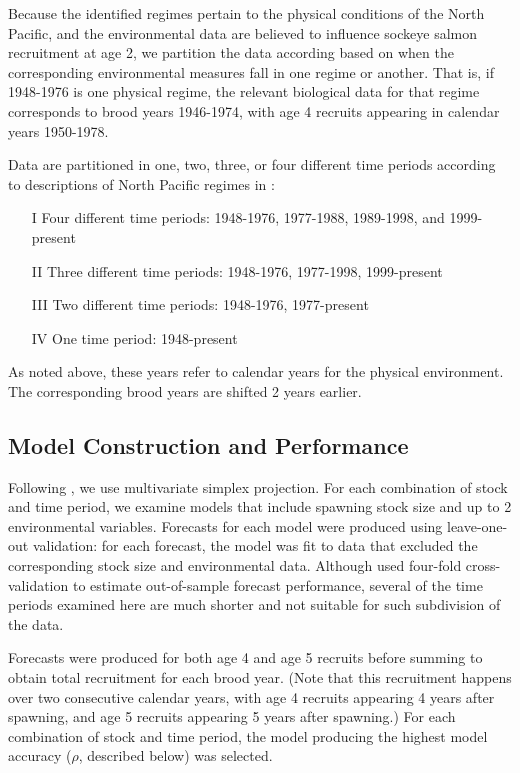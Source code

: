 Because the identified regimes pertain to the physical conditions of the North Pacific, and the environmental data are believed to influence sockeye salmon recruitment at age 2, we partition the data according based on when the corresponding environmental measures fall in one regime or another. That is, if 1948-1976 is one physical regime, the relevant biological data for that regime corresponds to brood years 1946-1974, with age 4 recruits appearing in calendar years 1950-1978.

Data are partitioned in one, two, three, or four different time periods according to descriptions of North Pacific regimes in \cite{McGowan_2003, Beamish_2004a, Litzow_2014}:
\begin{itemize}
\item[I] Four different time periods: 1948-1976, 1977-1988, 1989-1998, and 1999-present
\item[II] Three different time periods: 1948-1976, 1977-1998, 1999-present
\item[III] Two different time periods: 1948-1976, 1977-present
\item[IV] One time period: 1948-present
\end{itemize}
As noted above, these years refer to calendar years for the physical environment. The corresponding brood years are shifted 2 years earlier.

\subsection{Model Construction and Performance}

Following \cite{Ye_2015}, we use multivariate simplex projection. For each combination of stock and time period, we examine models that include spawning stock size and up to 2 environmental variables. Forecasts for each model were produced using leave-one-out validation: for each forecast, the model was fit to data that excluded the corresponding stock size and environmental data. Although \cite{Ye_2015} used four-fold cross-validation to estimate out-of-sample forecast performance, several of the time periods examined here are much shorter and not suitable for such subdivision of the data.

Forecasts were produced for both age 4 and age 5 recruits before summing to obtain total recruitment for each brood year. (Note that this recruitment happens over two consecutive calendar years, with age 4 recruits appearing 4 years after spawning, and age 5 recruits appearing 5 years after spawning.) For each combination of stock and time period, the model producing the highest model accuracy ($\rho$, described below) was selected.

